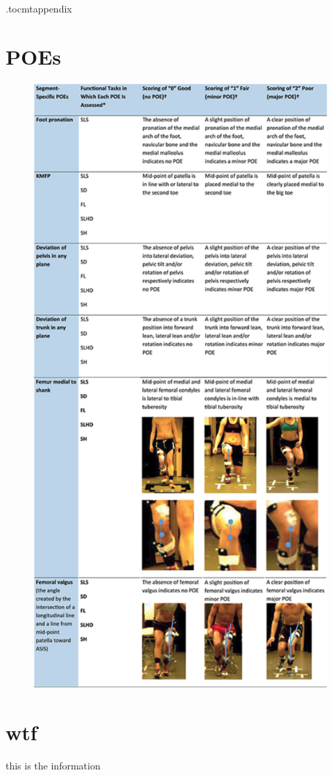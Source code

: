 \newpage
\appendix
\newpage
\etocdepthtag.toc{mtappendix}
\tableofcontents
\newpage


\chapter{POEs}
\begin{figure}
  \centering
  \includegraphics[height=\textheight]{files/figs/poes-detailed-rot.png}
  \label{}
\end{figure}


\chapter{wtf}
this is the information
